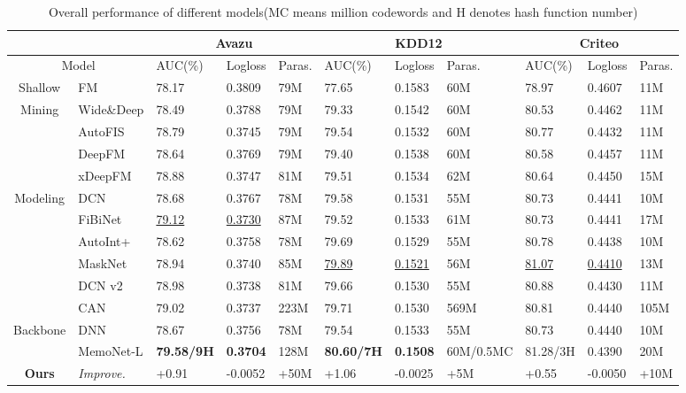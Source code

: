 \documentclass[sigconf,authorversion]{acmart}
\begin{document}
\begin{table*}
\centering
\caption{Overall performance of different models(MC means million codewords and  H denotes hash function number)}
\begin{tabular}{c|l|lllllllll}
\toprule
 \multicolumn{2}{c}{} & \multicolumn{3}{c}{\textbf{Avazu}}  & \multicolumn{3}{c}{\textbf{KDD12} } & \multicolumn{3}{c}{\textbf{Criteo}} \\
\midrule
\multicolumn{2}{c}{Model} & AUC(\%)  &  Logloss  &Paras. & AUC(\%)  & Logloss  &Paras. & AUC(\%)  & Logloss  &Paras.   \\
\midrule
Shallow &FM       & 78.17 &0.3809 &79M  & 77.65 &0.1583 &60M & 78.97  & 0.4607 &11M \\
\midrule
Mining &Wide\&Deep      & 78.49 &0.3788 &79M  & 79.33 &0.1542 &60M & 80.53  & 0.4462 &11M   \\
   &AutoFIS       & 78.79 &0.3745 &79M  & 79.54 &0.1532 &60M & 80.77  & 0.4432 &11M   \\
\midrule
   &DeepFM       & 78.64 &0.3769 &79M  & 79.40 &0.1538 &60M & 80.58  & 0.4457 &11M   \\
 &xDeepFM       & 78.88 &0.3747 &81M  & 79.51 &0.1534 &62M & 80.64  & 0.4450 &15M   \\
 Modeling &DCN       & 78.68 &0.3767 &78M  & 79.58 &0.1531 &55M & 80.73  & 0.4441 &10M   \\
 &FiBiNet       & \underline{79.12} &\underline{0.3730} &87M  & 79.52 &0.1533 &61M & 80.73  & 0.4441 &17M   \\
  &AutoInt+       & 78.62 &0.3758 &78M  & 79.69 &0.1529 &55M & 80.78  & 0.4438 &10M   \\
  &MaskNet       & 78.94 &0.3740 &85M  & \underline{79.89} &\underline{0.1521} &56M & \underline{81.07}  & \underline{0.4410} &13M   \\
   &DCN v2       & 78.98 &0.3738 &81M  & 79.66 &0.1530 &55M & 80.88  & 0.4430 &11M   \\
    &CAN       & 79.02 &0.3737 &223M  & 79.71 &0.1530 &569M & 80.81  & 0.4440 &105M   \\
\midrule
\midrule
Backbone&DNN       & 78.67 &0.3756 &78M  & 79.54 &0.1533 &55M & 80.73  & 0.4440 &10M   \\
\midrule
&  MemoNet-L & \textbf{79.58/9H} & \textbf{0.3704} &128M  & \textbf{80.60/7H} &\textbf{0.1508} &60M/0.5MC & 81.28/3H  & 0.4390 &20M    \\
\textbf{Ours}&  \quad \emph{Improve.} & +0.91 & -0.0052 &+50M  & +1.06 &-0.0025 &+5M & +0.55  & -0.0050 &+10M    \\

\end{tabular}
\end{table*}
\end{document}
